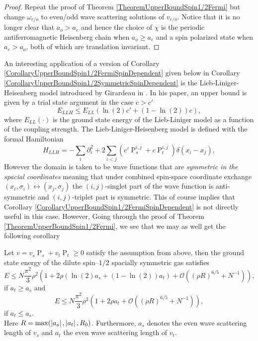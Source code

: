 \begin{proof}
	Repeat the proof of Theorem \ref{TheoremUpperBoundSpin1/2Fermi} but change $ \omega_{e/o} $ to even/odd wave scattering solutions of $ v_{e/o} $. Notice that it is no longer clear that $ a_o>a_e $ and hence the choice of $ \chi $ is the periodic antiferromagnetic Heisenberg chain when $ a_o\geq a_e $ and a spin polarized state when $ a_e>a_o $, both of which are translation invariant.
\end{proof}
An interesting application of a version of Corollary \ref{CorollaryUpperBoundSpin1/2FermiSpinDependent} given below in Corollary \ref{CorollaryUpperBoundSpin1/2SymmetricSpinDependent} is the Lieb-Liniger-Heisenberg model introduced by Girardeau in \cite{girardeau2006ground}. In his paper, an upper bound is given by a trial state argument in the case $ c>c' $ \begin{equation}\label{EqGirardeauUpperBoundLLH}
E_{LLH}\leq E_{LL}(\ln(2)c'+(1-\ln(2))c),
\end{equation}
where $ E_{LL}(\cdot) $ is the ground state energy of the Lieb-Liniger model as a function of the coupling strength. The Lieb-Liniger-Heisenberg model is defined with the formal Hamiltonian\begin{equation}\label{EqHamiltonianLLH}
H_{LLH}=-\sum_i \partial_i^2 +2\sum_{i<j} \left(c'\operatorname{P}^{i,j}_s+c\operatorname{P}^{i,j}_t\right)\delta(x_i-x_j),
\end{equation}
However the domain is taken to be wave functions that are \emph{symmetric in the spacial coordinates} meaning that under combined spin-space coordinate exchange $ (x_i,\sigma_i)\leftrightarrow(x_j,\sigma_j) $ the $ (i,j) $-singlet part of the wave function is anti-symmetric and $ (i,j) $-triplet part is symmetric. This of course implies that Corollary \ref{CorollaryUpperBoundSpin1/2FermiSpinDependent} is not directly useful in this case. However, Going through the proof of Theorem \ref{TheoremUpperBoundSpin1/2Fermi}, we see that we may as well get the following corollary  
\begin{corollary}\label{CorollaryUpperBoundSpin1/2SymmetricSpinDependent}
	Let $ v=v_s\operatorname{P}_s+v_t\operatorname{P}_t\geq0 $ satisfy the assumption from above, then the ground state energy of the dilute spin--$ 1/2 $ spacially symmetric gas satisfies\begin{equation}
	E\leq N\frac{\pi^2}{3}\rho^2\left(1+2\rho \left(\ln(2) a_s+(1-\ln(2))a_t\right)+\mathcal{O}\left((\rho R)^{6/5}+N^{-1}\right)\right),
	\end{equation}
	if $ a_t\geq a_s $ and 
	\begin{equation}
	E\leq N\frac{\pi^2}{3}\rho^2\left(1+2\rho a_t+\mathcal{O}\left((\rho R)^{6/5}+N^{-1}\right)\right),
	\end{equation}
	if $ a_t \leq a_s $.\\
	Here $ R=\max(\left\lvert a_s \right\rvert, \left\lvert a_t \right\rvert, R_0) $. Furthermore, $ a_s $ denotes the even wave scattering length of $ v_s $ and $ a_t $ the even wave scattering length of $ v_t $.
\end{corollary}
